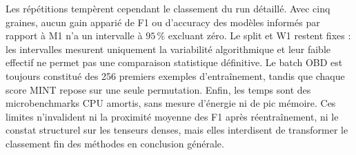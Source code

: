 Les répétitions tempèrent cependant le classement du run détaillé. Avec cinq
graines, aucun gain apparié de F1 ou d'accuracy des modèles informés par rapport
à M1 n'a un intervalle à $95\,\%$ excluant zéro. Le split
et W1 restent fixes : les intervalles mesurent uniquement la variabilité
algorithmique et leur faible effectif ne permet pas une comparaison
statistique définitive. Le batch OBD est toujours constitué des 256 premiers
exemples d'entraînement, tandis que chaque score MINT repose sur une seule
permutation. Enfin, les temps sont des microbenchmarks CPU amortis, sans mesure
d'énergie ni de pic mémoire. Ces limites n'invalident ni la proximité moyenne
des F1 après réentraînement, ni le constat structurel sur les
tenseurs denses, mais elles interdisent de transformer le classement fin des
méthodes en conclusion générale.
